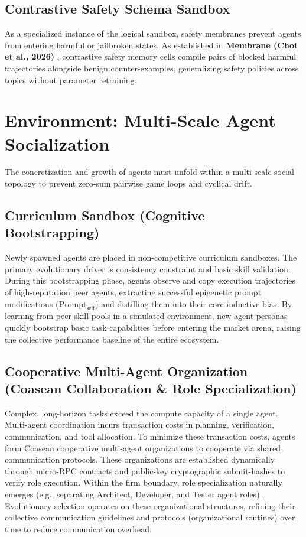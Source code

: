 \documentclass[10pt,journal,compsoc]{IEEEtran}
\begin{document}
\subsection{Contrastive Safety Schema Sandbox}
As a specialized instance of the logical sandbox, safety membranes prevent agents from entering harmful or jailbroken states. As established in \textbf{Membrane (Choi et al., 2026)} \cite{membrane2026v1}, contrastive safety memory cells compile pairs of blocked harmful trajectories alongside benign counter-examples, generalizing safety policies across topics without parameter retraining.

\section{Environment: Multi-Scale Agent Socialization}
The concretization and growth of agents must unfold within a multi-scale social topology to prevent zero-sum pairwise game loops and cyclical drift.

\subsection{Curriculum Sandbox (Cognitive Bootstrapping)}
Newly spawned agents are placed in non-competitive curriculum sandboxes. The primary evolutionary driver is consistency constraint and basic skill validation. During this bootstrapping phase, agents observe and copy execution trajectories of high-reputation peer agents, extracting successful epigenetic prompt modifications ($\text{Prompt}_{\text{self}}$) and distilling them into their core inductive bias. By learning from peer skill pools in a simulated environment, new agent personas quickly bootstrap basic task capabilities before entering the market arena, raising the collective performance baseline of the entire ecosystem.

\subsection{Cooperative Multi-Agent Organization (Coasean Collaboration \& Role Specialization)}
Complex, long-horizon tasks exceed the compute capacity of a single agent. Multi-agent coordination incurs transaction costs in planning, verification, communication, and tool allocation. To minimize these transaction costs, agents form Coasean cooperative multi-agent organizations \cite{coase1937} to cooperate via shared communication protocols. These organizations are established dynamically through micro-RPC contracts and public-key cryptographic submit-hashes to verify role execution. Within the firm boundary, role specialization naturally emerges (e.g., separating Architect, Developer, and Tester agent roles). Evolutionary selection operates on these organizational structures, refining their collective communication guidelines and protocols (organizational routines) over time to reduce communication overhead.
\end{document}
